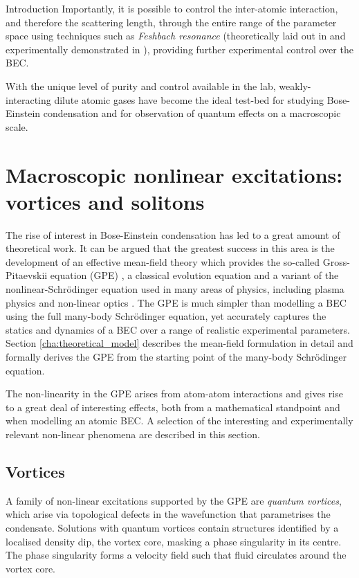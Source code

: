 \begin{chapter}{\label{cha:bose_gases}Introduction}
Importantly, it is possible to control the inter-atomic interaction, and therefore the scattering length, through the entire range of the parameter space using techniques such as {\it Feshbach resonance} (theoretically laid out in \cite{weiner2003cold} and experimentally demonstrated in \cite{Inouye1998,PhysRevLett.82.2422,PhysRevLett.85.1795}), providing further experimental control over the BEC.

With the unique level of purity and control available in the lab, weakly-interacting dilute atomic gases have become the ideal test-bed for studying Bose-Einstein condensation and for observation of quantum effects on a macroscopic scale.


\section{Macroscopic nonlinear excitations: vortices and solitons}
The rise of interest in Bose-Einstein condensation has led to a great amount of theoretical work. It can be argued that the greatest success in this area is the development of an effective mean-field theory which provides the so-called Gross-Pitaevskii equation (GPE) \cite{Pethick,Pitaevskii61,Gross61,RevModPhys.71.463}, a classical evolution equation and a variant of the nonlinear-Schr\"odinger equation used in many areas of physics, including plasma physics \cite{PhysRevLett.37.693} and non-linear optics \cite{PhysRevA.65.053614,borisSolitons}. The GPE is much simpler than modelling a BEC using the full many-body Schr\"odinger equation, yet accurately captures the statics and dynamics \cite{RevModPhys.71.463,Denschlag97, Burger99, PhysRevLett.86.2926, Dutton27072001,vortices,lobo_2004,PhysRevLett.85.2857} of a BEC over a range of realistic experimental parameters. Section \ref{cha:theoretical_model} describes the mean-field formulation  in detail and formally derives the GPE from the starting point of the many-body Schr\"odinger equation.

The non-linearity in the GPE arises from atom-atom interactions and gives rise to a great deal of interesting effects, both from a mathematical standpoint and when modelling an atomic BEC. A selection of the interesting and experimentally relevant non-linear phenomena are described in this section.

\subsection{Vortices}
A family of non-linear excitations supported by the GPE are {\it quantum vortices}, which arise via topological defects in the wavefunction that parametrises the condensate. Solutions with quantum vortices contain structures identified by a localised density dip, the vortex core, masking a phase singularity in its centre. The phase singularity forms a velocity field such that fluid circulates around the vortex core.


\end{chapter}
